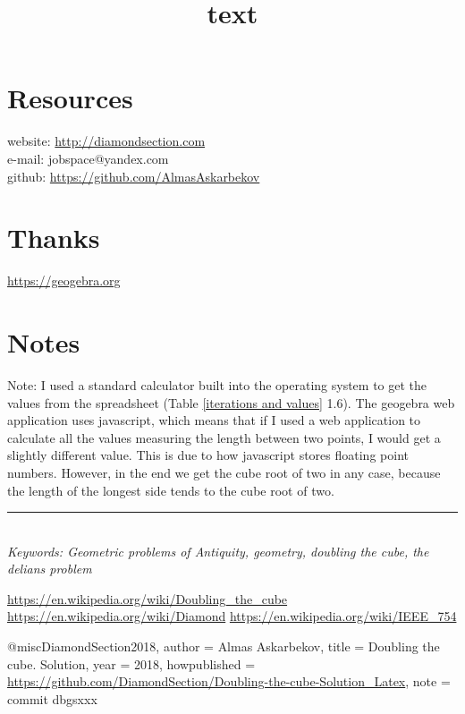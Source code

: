 \documentclass[12pt, letterpaper, oneside]{report}
\begin{document}
\begin{minipage}{0.8\textwidth}

\title{text}

	
\section{Resources}


website: \url{ http://diamondsection.com} \\
e-mail: jobspace@yandex.com \\
github: \url{https://github.com/AlmasAskarbekov}

\section{Thanks}
\url{https://geogebra.org}
\\
\section{Notes}
Note: I used a standard calculator built into the operating system to get the values from the spreadsheet (Table \ref{iterations and values} 1.6). The geogebra web application uses javascript, which means that if I used a web application to calculate all the values measuring the length between two points, I would get a slightly different value. This is due to how javascript stores floating point numbers\cite{C}.  However, in the end we get the cube root of two in any case, because the length of the longest side tends to the cube root of two.
\end{minipage}
\vspace{365pt}
\hrule
\ 
\\
\emph{Keywords: Geometric problems of Antiquity, geometry, doubling the cube, the delians problem}




\begin{thebibliography}{5}
\url{https://en.wikipedia.org/wiki/Doubling_the_cube}
\url{https://en.wikipedia.org/wiki/Diamond}
\url{https://en.wikipedia.org/wiki/IEEE_754}
\end{thebibliography}

\vspace{465pt}
@misc{DiamondSection2018,
	author = {Almas Askarbekov},
	title = {Doubling the cube. Solution},
	year = {2018},
	howpublished = {\url{https://github.com/DiamondSection/Doubling-the-cube-Solution_Latex}},
	note = {commit dbgsxxx}
}
\end{document}
